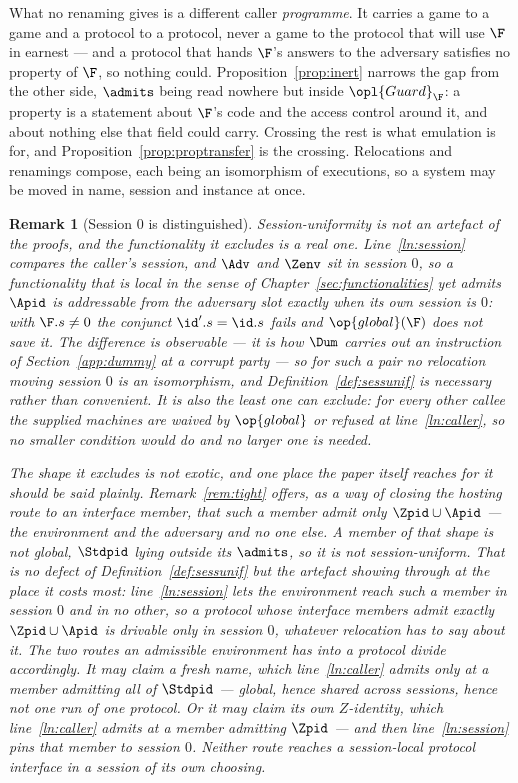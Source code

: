 \documentclass[10pt,oneside,openany]{book}
\theoremstyle{accentdef}
\newtheorem{remark}[definition]{Remark}
\theoremstyle{accentplain}
\begin{document}
What no renaming gives is a different caller \emph{programme}. It carries a game to a game and a
protocol to a protocol, never a game to the protocol that will use $\F$ in earnest --- and a protocol
that hands $\F$'s answers to the adversary satisfies no property of $\F$, so nothing could.
Proposition~\ref{prop:inert} narrows the gap from the other side, $\admits$ being read nowhere but
inside $\opl{Guard}_{\F}$: a property is a statement about $\F$'s code and the access control around
it, and about nothing else that field could carry. Crossing the rest is what emulation is for, and
Proposition~\ref{prop:proptransfer} is the crossing. Relocations and renamings compose, each being an
isomorphism of executions, so a system may be moved in name, session and instance at once.

\begin{remark}[Session $0$ is distinguished]\label{rem:sesszero}
Session-uniformity is not an artefact of the proofs, and the functionality it excludes is a real one.
Line~\ref{ln:session} compares the \emph{caller's} session, and $\Adv$ and $\Zenv$ sit in session $0$,
so a functionality that is \emph{local} in the sense of Chapter~\ref{sec:functionalities} yet admits
$\Apid$ is addressable from the adversary slot exactly when its own session is $0$: with
$\F.s \neq 0$ the conjunct $\id'.s = \id.s$ fails and $\op{global}(\F)$ does not save it. The
difference is observable --- it is how $\Dum$ carries out an instruction of Section~\ref{app:dummy}
at a corrupt party --- so for such a pair no relocation moving session $0$ is an isomorphism, and
Definition~\ref{def:sessunif} is necessary rather than convenient. It is also the least one can
exclude: for every other callee the supplied machines are waived by $\op{global}$ or refused at
line~\ref{ln:caller}, so no smaller condition would do and no larger one is needed.

The shape it excludes is not exotic, and one place the paper itself reaches for it should be said
plainly. Remark~\ref{rem:tight} offers, as a way of closing the hosting route to an
\emph{interface} member, that such a member admit only $\Zpid \cup \Apid$ --- the environment and the
adversary and no one else. A member of that shape is not global, $\Stdpid$ lying outside its $\admits$,
so it is not session-uniform. That is no defect of Definition~\ref{def:sessunif} but the artefact
showing through at the place it costs most: line~\ref{ln:session} lets the environment reach such a
member in session $0$ and in no other, so a protocol whose interface members admit exactly
$\Zpid \cup \Apid$ is drivable only in session $0$, whatever relocation has to say about it. The two
routes an admissible environment has into a protocol divide accordingly. It may claim a fresh name,
which line~\ref{ln:caller} admits only at a member admitting all of $\Stdpid$ --- global, hence shared
across sessions, hence not one run of one protocol. Or it may claim its own $Z$-identity, which
line~\ref{ln:caller} admits at a member admitting $\Zpid$ --- and then line~\ref{ln:session} pins that
member to session $0$. Neither route reaches a session-local protocol interface in a session of its
own choosing.


\end{remark}
\end{document}
